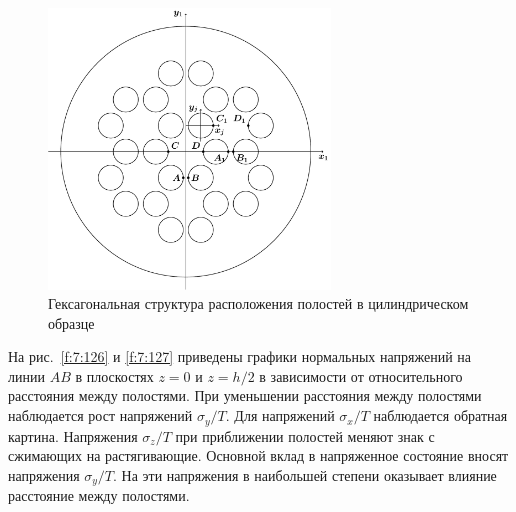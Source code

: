 
\begin{figure}[h!]
\centering
\includegraphics[width=7.5cm]{hexagonal.pdf}
\caption{Гексагональная структура расположения полостей в цилиндрическом образце}
\label{f:7:21}
\end{figure}

На рис.~\ref{f:7:126} и \ref{f:7:127} приведены графики нормальных напряжений на линии $AB$ в плоскостях $z=0$ и $z=h/2$ в зависимости от относительного расстояния между полостями. При уменьшении расстояния между полостями наблюдается рост напряжений $\sigma_y/T$. Для напряжений $\sigma_x/T$ наблюдается обратная картина. Напряжения $\sigma_z/T$ при приближении полостей меняют знак с сжимающих на растягивающие. Основной вклад в напряженное состояние вносят напряжения $\sigma_y/T$. На эти напряжения в наибольшей степени оказывает влияние расстояние между полостями.

